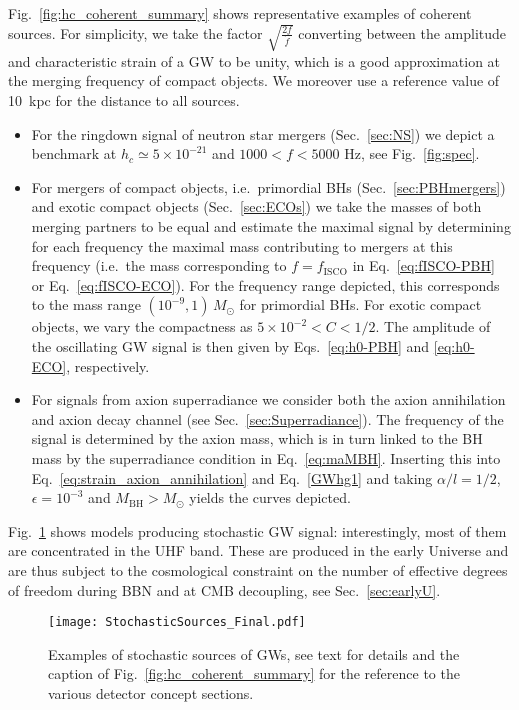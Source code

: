 \documentclass[11pt,a4paper]{article}
\begin{document}
Fig.~\ref{fig:hc_coherent_summary} shows representative examples of coherent sources. {For simplicity, we take the factor $\sqrt{\frac{2f}{\dot{f}}}$ converting between the amplitude and characteristic strain of a GW to be unity, which is a good approximation at the merging frequency of compact objects. We moreover use a reference value of 10~kpc for the distance to all sources.}
%
\begin{itemize}
 \item For the ringdown signal of neutron star mergers (Sec.~\ref{sec:NS}) we depict a benchmark at $h_c \simeq 5 \times 10^{-21}$ and $1000<f<5000$ Hz, see Fig.~\ref{fig:spec}.
 \item {For mergers of compact objects, i.e.\ primordial BHs (Sec.~\ref{sec:PBHmergers}) and exotic compact objects (Sec.~\ref{sec:ECOs}) we take the masses of both merging partners to be equal and estimate the maximal signal by determining for each frequency the maximal mass contributing to mergers at this frequency (i.e.\ the mass corresponding to $f = f_\text{ISCO}$ in Eq.~\eqref{eq:fISCO-PBH} or Eq.~\eqref{eq:fISCO-ECO}). For the frequency range depicted, this corresponds to the mass range $(10^{-9}, 1) \, M_\odot$ for primordial BHs. For exotic compact objects, we vary the compactness as $5 \times 10^{-2} < C < 1/2$. The amplitude of the oscillating GW signal is then given by Eqs.~\eqref{eq:h0-PBH} and \eqref{eq:h0-ECO}, respectively. }
 \item {For signals from axion superradiance we consider both the axion annihilation and axion decay channel (see Sec.~\ref{sec:Superradiance}). The frequency of the signal is determined by the axion mass, which is in turn linked to the BH mass by the superradiance condition in Eq.~\eqref{eq:maMBH}. Inserting this into Eq.~\eqref{eq:strain_axion_annihilation} and Eq.~\eqref{GWhg1} and taking $\alpha/l =1/2$, $\epsilon=10^{-3}$ and $M_\text{BH} > M_\odot$ yields the curves depicted.}
\end{itemize}

Fig.~\ref{fig:hc_stochastic_summary} shows models producing stochastic GW signal: interestingly, most of them are concentrated in the UHF band. These are produced in the early Universe and are thus subject to the cosmological constraint on the number of effective degrees of freedom during BBN and at CMB decoupling, see Sec.~\ref{sec:earlyU}.

\begin{figure}
    \centering
    \texttt{[image: StochasticSources\_Final.pdf]}
    \caption{Examples of stochastic sources of GWs, see text for details and the caption of Fig.~\ref{fig:hc_coherent_summary} for the reference to the various detector concept sections.}
    \label{fig:hc_stochastic_summary}
\end{figure}
\end{document}
